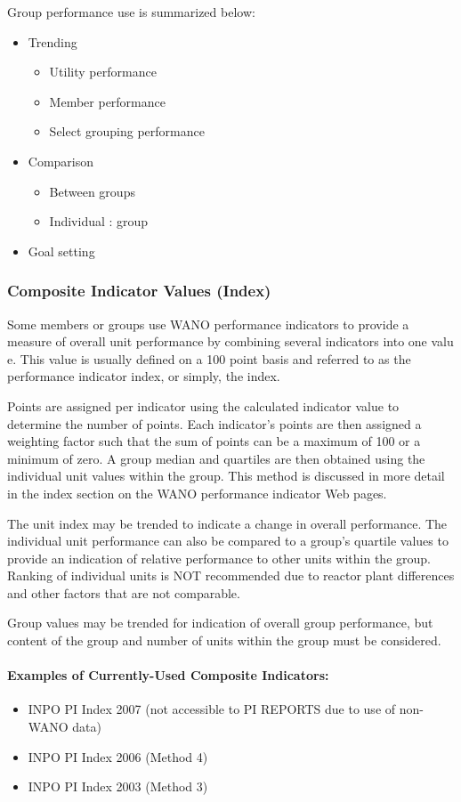 Group performance use is summarized below:
\begin{itemize}
\item Trending
  \begin{itemize}
  \item Utility performance
  \item Member performance
  \item Select grouping performance
  \end{itemize}
\item Comparison
  \begin{itemize}
  \item Between groups
  \item Individual : group
  \end{itemize}
\item Goal setting
\end{itemize}

\subsubsection{Composite Indicator Values (Index) }

Some members or groups use WANO performance indicators to provide a measure of
overall unit performance by combining several indicators into one valu
e.  This value is usually defined on a 100 point basis and referred
 to as the performance indicator index, or simply, the index.

Points are assigned per indicator using the calculated indicator value to determine the
number of points.  Each indicator’s points are then assigned a weighting factor such that
the sum of points can be a maximum of 100 or a minimum of zero.  A group median and
quartiles are then obtained using the individual unit values within the group.  This
method is discussed in more detail in the index section on the WANO performance
indicator Web pages.

The unit index may be trended to indicate a change in overall performance.  The
individual unit performance can also be compared to a group’s quartile values to provide
an indication of relative performance to other units within the group.  Ranking of
individual units is NOT recommended due to reactor plant differences and other factors
that are not comparable.

Group values may be trended for indication of overall group performance, but content of
the group and number of units within the group must be considered.

\paragraph{Examples of Currently-Used Composite Indicators:}

\begin{itemize}
\item INPO PI Index 2007 (not accessible to PI REPORTS due to use of non-WANO data)
\item INPO PI Index 2006 (Method 4)
\item INPO PI Index 2003 (Method 3)
\end{itemize}
